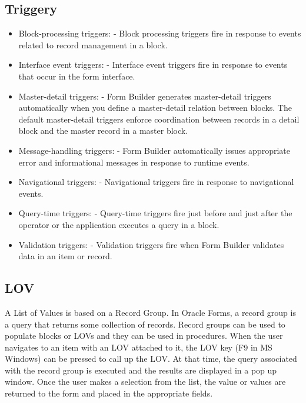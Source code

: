 \documentclass{bakalarka}
\begin{document}
\subsection{Triggery}
\begin{itemize}
\item Block-processing triggers: - Block processing triggers fire in response to events related to record management in a block.
\item Interface event triggers: - Interface event triggers fire in response to events that occur in the form interface.
\item Master-detail triggers: - Form Builder generates master-detail triggers automatically when you define a master-detail relation between blocks. The default master-detail triggers enforce coordination between records in a detail block and the master record in a master block.
\item Message-handling triggers: - Form Builder automatically issues appropriate error and informational messages in response to runtime events.
\item Navigational triggers: - Navigational triggers fire in response to navigational events.
\item Query-time triggers: - Query-time triggers fire just before and just after the operator or the application executes a query in a block. 
\item Validation triggers: - Validation triggers fire when Form Builder validates data in an item or record.
\end{itemize}

\subsection{LOV}
A List of Values is based on a Record Group. In Oracle Forms, a record group is a query that returns some collection of records. Record groups can be used to populate blocks or LOVs and they can be used in procedures. When the user navigates to an item with an LOV attached to it, the LOV key (F9 in MS Windows) can be pressed to call up the LOV. At that time, the query associated with the record group is executed and the results are displayed in a pop up window. Once the user makes a selection from the list, the value or values are returned to the form and placed in the appropriate fields.
\end{document}
